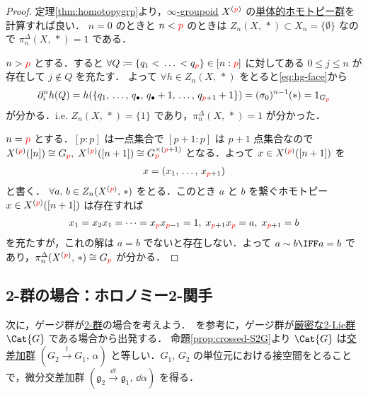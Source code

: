 \documentclass[TQFT_main]{subfiles}
\begin{document}
\begin{proof}
    定理\ref{thm:homotopygrp}より，\hyperref[def:infinity-1]{$\infty$-groupoid} $X^{(\textcolor{red}{p})}$ の\hyperref[def:simpi]{単体的ホモトピー群}を計算すれば良い．
    $n=0$ のときと $n < \textcolor{red}{p}$ のときは $Z_n (X,\, *) \subset X_n = \{\emptyset\}$ なので $\pi^\Delta_n (X,\, *) = 1$ である．

    $n > \textcolor{red}{p}$ とする．すると $\forall Q \coloneqq \{q_1 <\, \dots\, < q_{\textcolor{red}{p}}\} \in [n:\textcolor{red}{p}]$ に対してある $0 \le j \le n$ が存在して $j \notin Q$ を充たす．
    よって $\forall h \in Z_n (X,\, *)$ をとると\eqref{eq:hg-face}から
    \begin{align}
        \partial^n_i h (Q) = h(\{q_1,\, \dots,\, q_{\bullet},\, q_{\bullet} + 1,\, \dots,\, q_{\textcolor{red}{p} + 1} + 1\}) = (\sigma_0)^{n-1} (*) = 1_{G_{\textcolor{red}{p}}}
    \end{align}
    が分かる．i.e. $Z_n(X,\, *) = \{1\}$ であり，$\pi^\Delta_n (X,\, *) = 1$ が分かった．

    $n = \textcolor{red}{p}$ とする．$[p:p]$ は一点集合で $[p+1:p]$ は $p+1$ 点集合なので $X^{(\textcolor{red}{p})}([n]) \cong G_{\textcolor{red}{p}},\; X^{(\textcolor{red}{p})} ([n+1]) \cong G_{\textcolor{red}{p}}^{\times (\textcolor{red}{p}+1)}$ となる．よって $x \in X^{(\textcolor{red}{p})} ([n+1])$ を
    \begin{align}
        x = (x_1,\, \dots,\, x_{\textcolor{red}{p}+1})
    \end{align}
    と書く．
    $\forall a,\, b \in Z_n (X^{(\textcolor{red}{p})},\, *)$ をとる．このとき $a$ と $b$ を繋ぐホモトピー $x \in X^{(\textcolor{red}{p})} ([n+1])$ は存在すれば
    \begin{align}
        x_1 = x_2 x_1 = \cdots = x_{\textcolor{red}{p}} x_{\textcolor{red}{p}-1} = 1,\; x_{\textcolor{red}{p}+1} x_{\textcolor{red}{p}} = a,\; x_{\textcolor{red}{p}+1} = b
    \end{align}
    を充たすが，これの解は $a=b$ でないと存在しない．よって $a \sim b \IFF a=b$ であり，$\pi^\Delta_n (X^{(\textcolor{red}{p})},\, *) \cong G_{\textcolor{red}{p}}$ が分かる．
\end{proof}

\subsection{2-群の場合：ホロノミー2-関手}

次に，ゲージ群が\hyperref[def:W2G-C2G]{2-群}の場合を考えよう．~\cite{KapustinThorngren2015higher}を参考に，ゲージ群が\hyperref[def:W2G-C2G]{厳密な2-Lie群} $\Cat{G}$ である場合から出発する．
命題\ref{prop:crossed-S2G}より $\Cat{G}$ は\hyperref[def:crossed-module]{交差加群} $(G_2 \xrightarrow{t} G_1,\, \alpha)$ と等しい．$G_1,\, G_2$ の単位元における接空間をとることで，微分交差加群 $(\mathfrak{g}_2 \xrightarrow{\dd{t}} \mathfrak{g}_1,\, \dd{\alpha})$ を得る．
\end{document}
